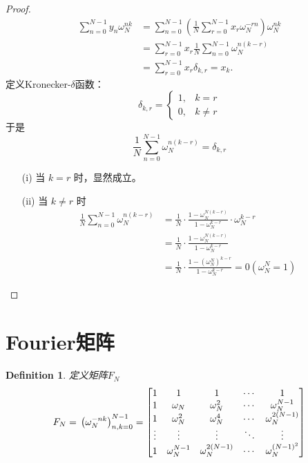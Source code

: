 \documentclass[linespread=1.5,openany]{book}%
\theoremstyle{plain}
\newtheorem{definition}{Definition}
\begin{document}
{{{					\begin{proof}
						\begin{equation}
							\begin{aligned}
								\sum_{n=0}^{N-1} y_n \omega_N^{nk} 
								&= \sum_{n=0}^{N-1} \left( \frac{1}{N} \sum_{r=0}^{N-1} x_r \omega_N^{-rn} \right) \omega_N^{nk} \\[8pt]
								&= \sum_{r=0}^{N-1} x_r \frac{1}{N} \sum_{n=0}^{N-1} \omega_N^{n(k - r)} \\[8pt]
								&= \sum_{r=0}^{N-1} x_r \delta_{k,r} = x_k.
							\end{aligned}
						\end{equation}
						定义Kronecker-$\delta$函数：
						\begin{equation}
							\delta_{k,r} = 
							\begin{cases} 
								1, & k = r \\[8pt]
								0, & k \neq r 
							\end{cases}
						\end{equation}
						于是
						\begin{equation}
							\frac{1}{N}\sum_{n=0}^{N-1}\omega_N^{n(k-r)}=\delta_{k,r}
						\end{equation}
						
						\begin{itemize}
							\item[(i)]当 $k=r$ 时，显然成立。
							\item[(ii)]当 $k \neq r$ 时
							\begin{equation}
								\begin{aligned}
									\frac{1}{N}\sum_{n=0}^{N-1}\omega_N^{n(k-r)} &= \frac{1}{N} \cdot \frac{1 - \omega_N^{N(k-r)}}{1 - \omega_N^{k-r}} \cdot \omega_N^{k-r} \\[8pt]
									&= \frac{1}{N} \cdot \frac{1 - \omega_N^{N(k-r)}}{1 - \omega_N^{k-r}} \\[8pt]
									&= \frac{1}{N} \cdot \frac{1 - (\omega_N^N)^{k-r}}{1 - \omega_N^{k-r}} = 0(\omega_N^N = 1)
								\end{aligned}
							\end{equation}
						\end{itemize}	
					\end{proof}
					\section{Fourier矩阵}
					\begin{definition}
						定义矩阵$F_N$
						\[F_N=\\ \left( \omega_N^{-nk} \right)_{n,k=0}^{N-1}
						=\begin{bmatrix}
							1 & 1 & 1 & \cdots & 1 \\
							1 & \omega_N & \omega_N^2 & \cdots & \omega_N^{N-1} \\
							1 & \omega_N^2 & \omega_N^4 & \cdots & \omega_N^{2(N-1)} \\
							\vdots & \vdots & \vdots & \ddots & \vdots \\
							1 & \omega_N^{N-1} & \omega_N^{2(N-1)} & \cdots & \omega_N^{(N-1)^2}
						\end{bmatrix}\]
						

\end{definition}}}}
\end{document}
